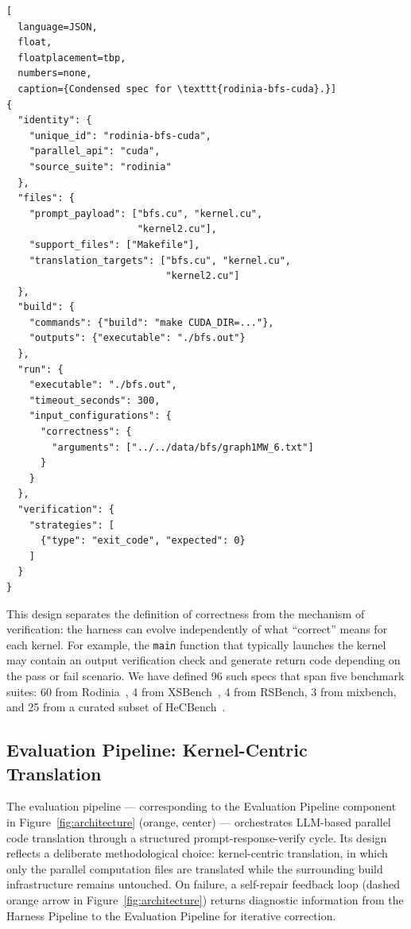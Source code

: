 \documentclass[conference]{IEEEtran}
\begin{document}
\begin{lstlisting}[
  language=JSON,
  float,
  floatplacement=tbp,
  numbers=none,
  caption={Condensed spec for \texttt{rodinia-bfs-cuda}.}]
{
  "identity": {
    "unique_id": "rodinia-bfs-cuda",
    "parallel_api": "cuda",
    "source_suite": "rodinia"
  },
  "files": {
    "prompt_payload": ["bfs.cu", "kernel.cu",
                       "kernel2.cu"],
    "support_files": ["Makefile"],
    "translation_targets": ["bfs.cu", "kernel.cu",
                            "kernel2.cu"]
  },
  "build": {
    "commands": {"build": "make CUDA_DIR=..."},
    "outputs": {"executable": "./bfs.out"}
  },
  "run": {
    "executable": "./bfs.out",
    "timeout_seconds": 300,
    "input_configurations": {
      "correctness": {
        "arguments": ["../../data/bfs/graph1MW_6.txt"]
      }
    }
  },
  "verification": {
    "strategies": [
      {"type": "exit_code", "expected": 0}
    ]
  }
}
\end{lstlisting}

This design separates the definition of correctness from the mechanism of verification: the harness can evolve independently of what ``correct'' means for each kernel. For example, the \texttt{main} function that typically launches the kernel may contain an output verification check and generate return code depending on the pass or fail scenario. We have defined 96 such specs that span five benchmark suites: 60 from Rodinia~\cite{Rodinia2009}, 4 from XSBench~\cite{XSBench2014}, 4 from RSBench, 3 from mixbench, and 25 from a curated subset of HeCBench~\cite{HeCBench2023}.

\subsection{Evaluation Pipeline: Kernel-Centric Translation}
\label{sec:eval-pipeline}

The evaluation pipeline --- corresponding to the Evaluation Pipeline component in Figure~\ref{fig:architecture} (orange, center) --- orchestrates LLM-based parallel code translation through a structured prompt-response-verify cycle. Its design reflects a deliberate methodological choice: kernel-centric translation, in which only the parallel computation files are translated while the surrounding build infrastructure remains untouched. On failure, a self-repair feedback loop (dashed orange arrow in Figure~\ref{fig:architecture}) returns diagnostic information from the Harness Pipeline to the Evaluation Pipeline for iterative correction.
\end{document}
